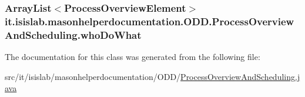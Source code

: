 \hypertarget{classit_1_1isislab_1_1masonhelperdocumentation_1_1_o_d_d_1_1_process_overview_and_scheduling_a19435fe761c50ba80b9a5ca705102e21}{
\subsubsection[{who\-Do\-What}]{\setlength{\rightskip}{0pt plus 5cm}Array\-List$<${\bf Process\-Overview\-Element}$>$ it.\-isislab.\-masonhelperdocumentation.\-O\-D\-D.\-Process\-Overview\-And\-Scheduling.\-who\-Do\-What\hspace{0.3cm}{\ttfamily [private]}}}\label{classit_1_1isislab_1_1masonhelperdocumentation_1_1_o_d_d_1_1_process_overview_and_scheduling_a19435fe761c50ba80b9a5ca705102e21}


The documentation for this class was generated from the following file\-:\begin{DoxyCompactItemize}
\item 
src/it/isislab/masonhelperdocumentation/\-O\-D\-D/\hyperlink{_process_overview_and_scheduling_8java}{Process\-Overview\-And\-Scheduling.\-java}\end{DoxyCompactItemize}
